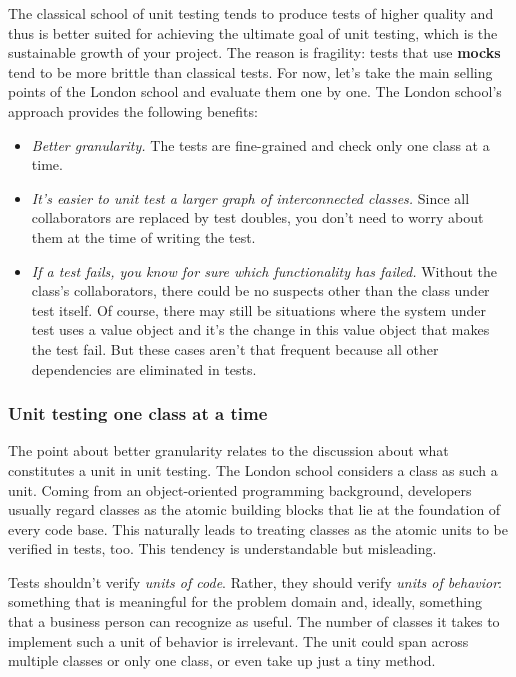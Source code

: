 \documentclass{article}
\begin{document}
The classical school of unit testing tends to produce tests of higher quality and thus is better suited for achieving the ultimate goal of unit testing, which is the sustainable growth of your project. The reason is fragility: tests that use \textbf{mocks} tend to be more brittle than classical tests. For now, let’s take the main selling points of the London school and evaluate them one by one. The London school’s approach provides the following benefits:
\begin{itemize}
	\item \textit{Better granularity.} The tests are fine-grained and check only one class at a time.
	\item \textit{It’s easier to unit test a larger graph of interconnected classes.} Since all collaborators
are replaced by test doubles, you don’t need to worry about them at the time of
writing the test.
	\item \textit{If a test fails, you know for sure which functionality has failed.} Without the class’s collaborators, there could be no suspects other than the class under test itself. Of course, there may still be situations where the system under test uses a value object and it’s the change in this value object that makes the test fail. But these cases aren’t that frequent because all other dependencies are eliminated in tests.
\end{itemize}

\subsubsection{ Unit testing one class at a time}
The point about better granularity relates to the discussion about what constitutes a unit in unit testing. The London school considers a class as such a unit. Coming from an object-oriented programming background, developers usually regard classes as the atomic building blocks that lie at the foundation of every code base. This naturally leads to treating classes as the atomic units to be verified in tests, too. This tendency is understandable but misleading.

Tests shouldn’t verify \textit{units of code}. Rather, they should verify \textit{units of behavior}: something that is meaningful for the problem domain and, ideally, something that a business person can recognize as useful. The number of classes it takes to implement such a unit of behavior is irrelevant. The unit could span across multiple classes or only one class, or even take up just a tiny method.
\end{document}
